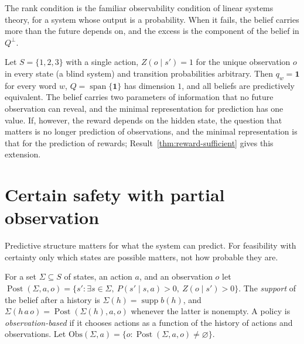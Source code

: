 The rank condition is the familiar observability condition of linear systems theory, for a system whose output is a probability. When it fails, the belief carries more than the future depends on, and the excess is the component of the belief in $Q^{\perp}$.

\begin{example}\label{ex:identical}
Let $S=\{1,2,3\}$ with a single action, $Z(o\mid s')=1$ for the unique observation $o$ in every state (a blind system) and transition probabilities arbitrary. Then $q_w=\mathbf 1$ for every word $w$, $Q=\operatorname{span}\{\mathbf 1\}$ has dimension $1$, and all beliefs are predictively equivalent. The belief carries two parameters of information that no future observation can reveal, and the minimal representation for prediction has one value. If, however, the reward depends on the hidden state, the question that matters is no longer prediction of observations, and the minimal representation is that for the prediction of rewards; Result~\ref{thm:reward-sufficient} gives this extension.
\end{example}

\section{Certain safety with partial observation}

Predictive structure matters for what the system can predict. For feasibility with certainty only which states are possible matters, not how probable they are.

For a set $\Sigma\subseteq S$ of states, an action $a$, and an observation $o$ let $\operatorname{Post}(\Sigma,a,o)=\{s':\exists s\in\Sigma,\ P(s'\mid s,a)>0,\ Z(o\mid s')>0\}$. The \emph{support} of the belief after a history is $\Sigma(h)=\operatorname{supp}b(h)$, and $\Sigma(h\,a\,o)=\operatorname{Post}(\Sigma(h),a,o)$ whenever the latter is nonempty. A policy is \emph{observation-based} if it chooses actions as a function of the history of actions and observations. Let $\mathrm{Obs}(\Sigma,a)=\{o:\operatorname{Post}(\Sigma,a,o)\ne\varnothing\}$.

